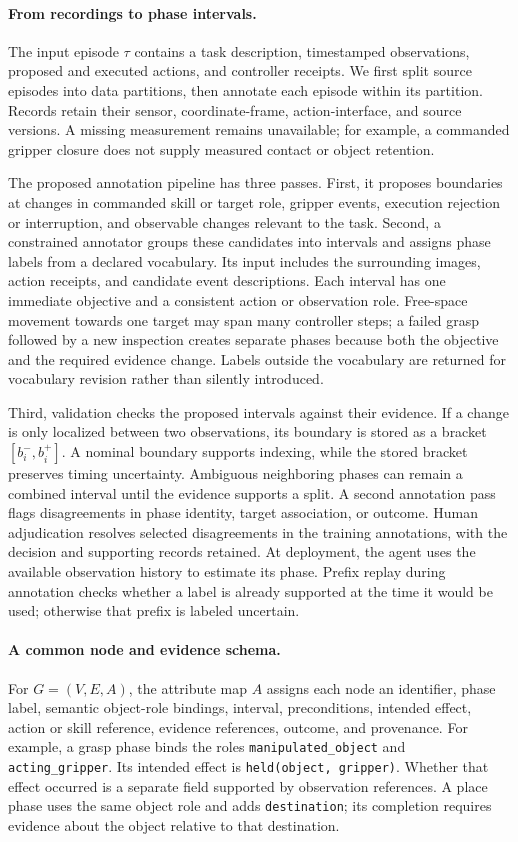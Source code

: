 \documentclass[10pt,twocolumn,letterpaper]{article}
\begin{document}
\paragraph{From recordings to phase intervals.}
The input episode $\tau$ contains a task description, timestamped observations, proposed and executed actions, and controller receipts. We first split source episodes into data partitions, then annotate each episode within its partition. Records retain their sensor, coordinate-frame, action-interface, and source versions. A missing measurement remains unavailable; for example, a commanded gripper closure does not supply measured contact or object retention.

The proposed annotation pipeline has three passes. First, it proposes boundaries at changes in commanded skill or target role, gripper events, execution rejection or interruption, and observable changes relevant to the task. Second, a constrained annotator groups these candidates into intervals and assigns phase labels from a declared vocabulary. Its input includes the surrounding images, action receipts, and candidate event descriptions. Each interval has one immediate objective and a consistent action or observation role. Free-space movement towards one target may span many controller steps; a failed grasp followed by a new inspection creates separate phases because both the objective and the required evidence change. Labels outside the vocabulary are returned for vocabulary revision rather than silently introduced.

Third, validation checks the proposed intervals against their evidence. If a change is only localized between two observations, its boundary is stored as a bracket $[b_i^{-},b_i^{+}]$. A nominal boundary supports indexing, while the stored bracket preserves timing uncertainty. Ambiguous neighboring phases can remain a combined interval until the evidence supports a split. A second annotation pass flags disagreements in phase identity, target association, or outcome. Human adjudication resolves selected disagreements in the training annotations, with the decision and supporting records retained. At deployment, the agent uses the available observation history to estimate its phase. Prefix replay during annotation checks whether a label is already supported at the time it would be used; otherwise that prefix is labeled uncertain.

\paragraph{A common node and evidence schema.}
For $G=(V,E,A)$, the attribute map $A$ assigns each node an identifier, phase label, semantic object-role bindings, interval, preconditions, intended effect, action or skill reference, evidence references, outcome, and provenance. For example, a grasp phase binds the roles \texttt{manipulated\_object} and \texttt{acting\_gripper}. Its intended effect is \texttt{held(object, gripper)}. Whether that effect occurred is a separate field supported by observation references. A place phase uses the same object role and adds \texttt{destination}; its completion requires evidence about the object relative to that destination.
\end{document}
